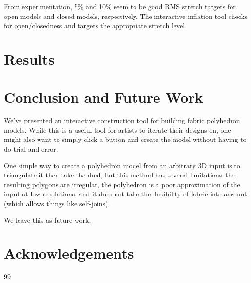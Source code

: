 \documentclass[letterpaper,11pt]{article}
\begin{document}
From experimentation, 5\% and 10\% seem to be good RMS stretch targets for open models and closed models, respectively. The interactive inflation tool checks for open/closedness and targets the appropriate stretch level.


\section*{Results}

\section*{Conclusion and Future Work}

We've presented an interactive construction tool for building fabric polyhedron models. While this is a useful tool for artists to iterate their designs on, one might also want to simply click a button and create the model without having to do trial and error.

One simple way to create a polyhedron model from an arbitrary 3D input is to triangulate it then take the dual, but this method has several limitations--the resulting polygons are irregular, the polyhedron is a poor approximation of the input at low resolutions, and it does not take the flexibility of fabric into account (which allows things like self-joins).

We leave this as future work.

\section*{Acknowledgements}


{\setlength{\baselineskip}{13pt}
\raggedright
\begin{thebibliography}{99}

\end{thebibliography}
}
\end{document}
